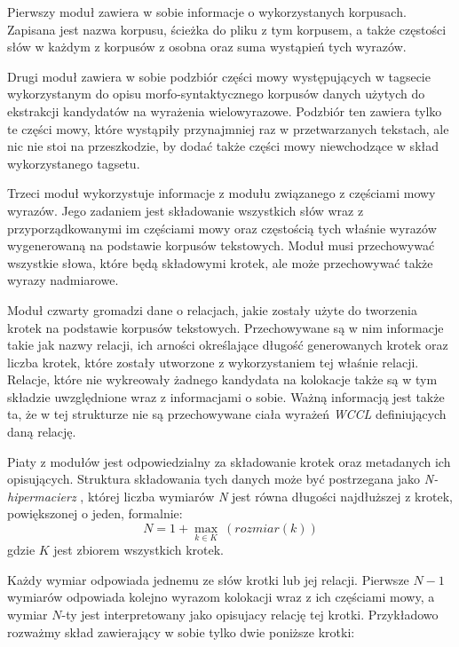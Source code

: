 \documentclass[11pt,a4paper]{llncs}
\begin{document}
Pierwszy moduł zawiera w sobie informacje o wykorzystanych korpusach.
Zapisana jest nazwa korpusu, ścieżka do pliku z tym korpusem, a także częstości słów w każdym z korpusów z osobna oraz suma wystąpień tych wyrazów.


Drugi  moduł zawiera w sobie podzbiór części mowy występujących w tagsecie wykorzystanym do opisu morfo-syntaktycznego korpusów danych użytych do ekstrakcji kandydatów na wyrażenia wielowyrazowe.
Podzbiór ten zawiera tylko te części mowy, które wystąpiły przynajmniej raz w przetwarzanych tekstach, ale nic nie stoi na przeszkodzie, by dodać także części mowy niewchodzące w skład wykorzystanego tagsetu.


Trzeci moduł wykorzystuje informacje z modułu związanego z częściami mowy wyrazów. 
Jego zadaniem jest składowanie wszystkich słów wraz z przyporządkowanymi im częściami mowy oraz częstością tych właśnie wyrazów wygenerowaną na podstawie korpusów tekstowych.
Moduł musi przechowywać wszystkie słowa, które będą składowymi krotek, ale może przechowywać także wyrazy nadmiarowe.


Moduł czwarty gromadzi dane o relacjach, jakie zostały użyte do tworzenia krotek na podstawie korpusów tekstowych.
Przechowywane są w nim informacje takie jak nazwy relacji, ich arności określające długość generowanych krotek oraz liczba krotek, które zostały utworzone z wykorzystaniem tej właśnie relacji.
Relacje, które nie wykreowały żadnego kandydata na kolokacje także są w tym składzie uwzględnione wraz z informacjami o sobie.
Ważną informacją jest także ta, że w tej strukturze nie są przechowywane ciała wyrażeń \emph{WCCL} definiujących daną relację.

Piaty z modułów jest odpowiedzialny za składowanie krotek oraz metadanych ich opisujących.
Struktura składowania tych danych może być postrzegana jako \emph{N-hipermacierz} \cite[rozdział 15]{hypermat}, której liczba wymiarów \emph{N} jest równa długości najdłuższej z krotek, powiększonej o jeden, formalnie:
$$N=1+\max_{k \in K} \: (rozmiar(k))$$
gdzie $K$ jest zbiorem wszystkich krotek.

Każdy wymiar odpowiada jednemu ze słów krotki lub jej relacji.
Pierwsze $N-1$ wymiarów odpowiada kolejno wyrazom kolokacji wraz z ich częściami mowy, a wymiar $N$-ty jest interpretowany jako opisujacy relację tej krotki.
Przykładowo rozważmy skład zawierający w sobie tylko dwie poniższe krotki:
\end{document}
